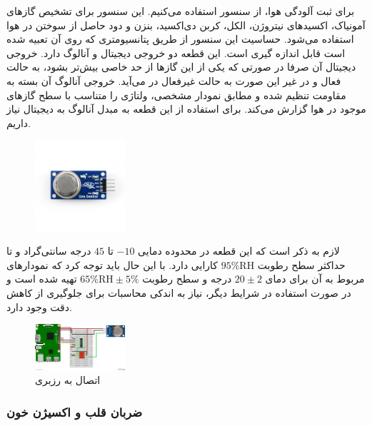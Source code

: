 \documentclass[12pt]{article}
\begin{document}
برای ثبت آلودگی هوا، از سنسور  استفاده می‌کنیم. این سنسور برای تشخیص گازهای آمونیاک، اکسید‌های نیتروژن، الکل، کربن‌ دی‌اکسید، بنزن و دود حاصل از سوختن در هوا استفاده می‌شود. حساسیت این سنسور از طریق پتانسیومتری که روی آن تعبیه شده است قابل اندازه گیری است. این قطعه دو خروجی دیجیتال و آنالوگ دارد. خروجی دیجیتال آن صرفا در صورتی که یکی از این گاز‌ها از حد خاصی بیش‌تر بشود،‌ به حالت فعال و در غیر این صورت به حالت غیرفعال در می‌آید. خروجی آنالوگ آن بسته به مقاومت تنظیم شده و مطابق نمودار مشخصی، ولتاژی را متناسب با سطح گازهای موجود در هوا گزارش می‌کند. برای استفاده از این قطعه به مبدل آنالوگ به دیجیتال نیاز داریم.

\begin{figure}[h]
	\begin{center}
		\includegraphics[width=0.3\textwidth]{mq-135}
	\end{center}
	\caption{}
\end{figure}

لازم به ذکر است که این قطعه در محدوده دمایی $-10$ تا $45$ درجه سانتی‌گراد و تا حداکثر سطح رطوبت 
$95 \% \text{RH}$
کارایی دارد. با این حال باید توجه کرد که نمودار‌های مربوط به آن برای دمای $20 \pm 2$ درجه و سطح رطوبت
$65 \% \text{RH} \pm 5\%$
تهیه شده است و در صورت استفاده در شرایط دیگر،‌ نیاز به اندکی محاسبات برای جلوگیری از کاهش دقت وجود دارد.

\begin{figure}[h]
	\begin{center}
		\includegraphics[width=0.3\textwidth]{mq-135-raspberry.png}
	\end{center}
	\caption{اتصال  به رزبری}
\end{figure}




\subsubsection{ضربان قلب و اکسیژن خون}
\end{document}
